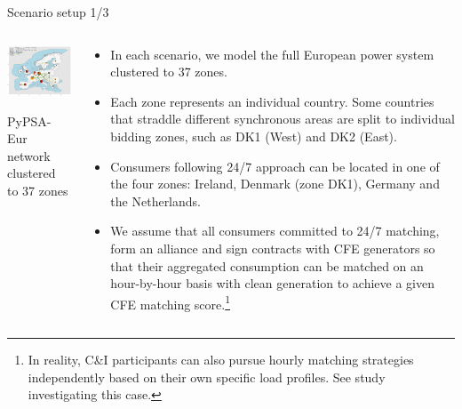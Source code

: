 \begin{frame}{Scenario setup 1/3}
 
  \begin{columns}[T]
  \begin{column}{7.2cm}

  \centering
  \vspace{0.3cm}
  \includegraphics[width=7.5cm]{images/elec_s_37.png}

  {\footnotesize 
  PyPSA-Eur network clustered to 37 zones
  }
  \end{column}

  \begin{column}{8.5cm}
  {\footnotesize 
  \begin{itemize}
  \item In each scenario, we model the full European power system 
  clustered to \alert{37 zones}. 
    
  \item Each zone represents an individual country. Some countries
  that straddle different synchronous areas are split to individual bidding zones, 
  such as DK1 (West) and DK2 (East).

  \item Consumers following 24/7 approach can be located in one of the \alert{four zones}: 
  Ireland, Denmark (zone DK1), Germany and the Netherlands.
    
  \item We assume that all consumers committed to 24/7 matching, form an alliance and sign contracts 
  with CFE generators so that their aggregated consumption can be matched 
  on an hour-by-hour basis with clean generation to achieve a given CFE matching score.\footnote
 {{\scriptsize In reality, C\&I participants can also pursue hourly matching strategies
  independently based on their own specific load profiles. 
  See  study investigating this case.}}
  
  \end{itemize}
  }
  
  \end{column}
  \end{columns}

\end{frame}



